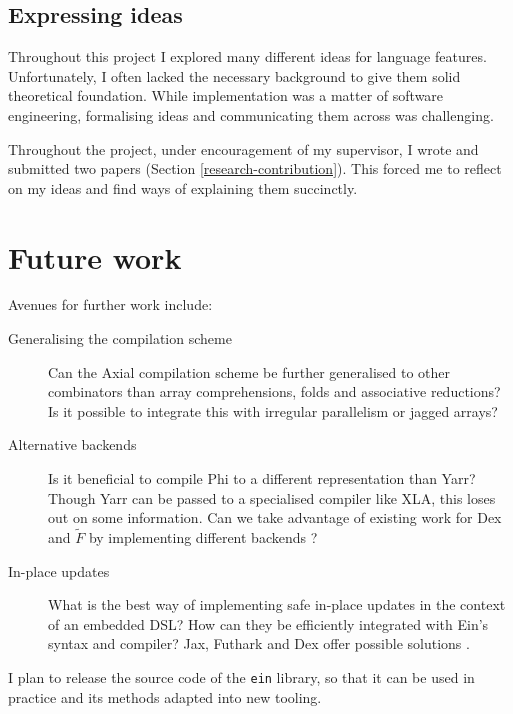 \subsection{Expressing ideas}

Throughout this project I explored many different ideas for language features. 
Unfortunately, I often lacked the necessary background to give them solid theoretical foundation. 
While implementation was a matter of software engineering, formalising ideas and communicating them across was challenging. 

Throughout the project, under encouragement of my supervisor, I wrote and submitted two papers (Section \ref{research-contribution}). 
This forced me to reflect on my ideas and find ways of explaining them succinctly.

\section{Future work}

Avenues for further work include:
\begin{description}
    \item[Generalising the compilation scheme] Can the Axial compilation scheme be further generalised to other combinators than array comprehensions, folds and associative reductions? Is it possible to integrate this with irregular parallelism or jagged arrays?
    \item[Alternative backends] Is it beneficial to compile Phi to a different representation than Yarr? Though Yarr can be passed to a specialised compiler like XLA, this loses out on some information. Can we take advantage of existing work for Dex and $\tilde F$ by implementing different backends \cite{shaikhha2019efficient, paszke2021getting}?
    \item[In-place updates] What is the best way of implementing safe in-place updates in the context of an embedded DSL? How can they be efficiently integrated with Ein's syntax and compiler? Jax, Futhark and Dex offer possible solutions \cite{jin2020compiling, henriksen2017futhark, paszke2021getting}.
\end{description}
I plan to release the source code of the \texttt{ein} library, so that it can be used in practice and its methods adapted into new tooling.